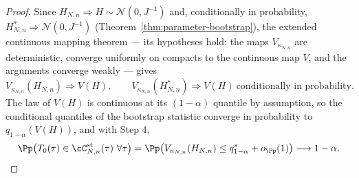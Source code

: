 \begin{proof}
Since $H_{N,n}\Rightarrow H\sim\mathcal N(0,J^{-1})$ and, conditionally in
probability, $H^*_{N,n}\Rightarrow\mathcal N(0,J^{-1})$
(Theorem~\ref{thm:parameter-bootstrap}), the extended continuous mapping
theorem \citep[Theorem~1.11.1]{vdVW1996} --- its hypotheses hold: the maps
$V_{\kappa_{N,n}}$ are deterministic, converge uniformly on compacts to the
continuous map $V$, and the arguments converge weakly --- gives
\[
 V_{\kappa_{N,n}}(H_{N,n})\Rightarrow V(H),
 \qquad
 V_{\kappa_{N,n}}(H^*_{N,n})\Rightarrow V(H)
 \ \text{conditionally in probability}.
\]
The law of $V(H)$ is continuous at its $(1-\alpha)$ quantile by assumption,
so the conditional quantiles of the bootstrap statistic converge in
probability to $q_{1-\alpha}(V(H))$, and with Step 4,
\[
 \Pp\big(T_0(\tau)\in\cC^{\mathrm{st}}_{N,n}(\tau)\ \forall\tau\big)
 =\Pp\big(V_{\kappa_{N,n}}(H_{N,n})\le q^*_{1-\alpha}+o_{\Pp}(1)\big)
 \longrightarrow1-\alpha .
\]
\end{proof}
